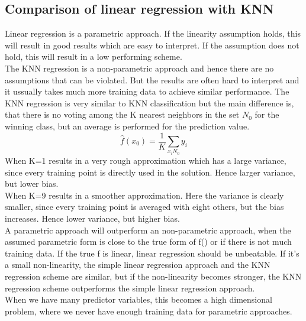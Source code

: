 \documentclass[../document.tex]{subfiles}
\begin{document}
	\subsection{Comparison of linear regression with KNN}
	Linear regression is a parametric approach. If the linearity assumption holds, this will result in good results which are easy to interpret. If the assumption does not hold, this will result in a low performing scheme.\\
	The KNN regression is a non-parametric approach and hence there are no assumptions that can be violated. But the results are often hard to interpret and it ussually takes much more training data to achieve similar performance. The KNN regression is very similar to KNN classification but the main difference is, that there is no voting among the K nearest neighbors in the set \(N_{0}\) for the winning class, but an average is performed for the prediction value.
	\begin{equation}
		\hat{f}(x_{0})=\frac{1}{K}\sum_{x_{i}N_{0}}y_{i}
	\end{equation}
	When K=1 results in a very rough approximation which has a large variance, since every training point is directly used in the solution. Hence larger variance, but lower bias.\\
	When K=9 results in a smoother approximation. Here the variance is clearly smaller, since every training point is averaged with eight others, but the bias increases. Hence lower variance, but higher bias.\\
	A parametric approach will outperform an non-parametric approach, when the assumed parametric form is close to the true form of f() or if there is not much training data. If the true f is linear, linear regression should be unbeatable. If it's a small non-linearity, the simple linear regression approach and the KNN regression scheme are similar, but if the non-linearity becomes stronger, the KNN regression scheme outperforms the simple linear regression approach.\\
	When we have many predictor variables, this becomes a high dimensional problem, where we never have enough training data for parametric approaches.	
\end{document}
